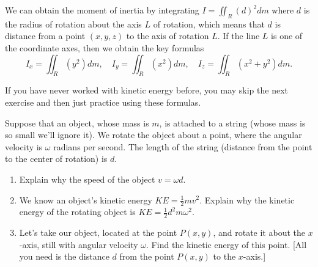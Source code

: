 {\begin{definition}
We can obtain the moment of inertia by integrating $I=\iint_R (d)^2 dm$ where $d$ is the radius of rotation about the axis $L$ of rotation, which means that $d$  is distance from a point $(x,y,z)$ to the axis of rotation $L$. If the line $L$ is one of the coordinate axes, then we obtain the key formulas 
$$
I_x = \iint_R (y^2)dm,\quad
I_y = \iint_R (x^2)dm,\quad
I_z = \iint_R (x^2+y^2)dm
.$$
\end{definition}

If you have never worked with kinetic energy before, you may skip the next exercise and then just practice using these formulas.



\begin{problem}
%
%
 Suppose that an object, whose mass is $m$, is attached to a string (whose mass is so small we'll ignore it). We rotate the object about a point, where the angular velocity is $\omega$ radians per second. The length of the string (distance from the point to the center of rotation) is $d$.
 \begin{enumerate}
 \item Explain why the speed of the object $v=\omega d$.  
 \item We know an object's kinetic energy $KE=\frac{1}{2}mv^2$. 
Explain why the kinetic energy of the rotating object is $KE = \frac{1}{2}d^2m\omega^2$. 
  \item Let's take our object, located at the point $P(x,y)$, and rotate it about the $x$-axis, still with angular velocity $\omega$. Find the kinetic energy of this point. [All you need is the distance $d$ from the point $P(x,y)$ to the $x$-axis.]

\end{enumerate}
\end{problem}}
